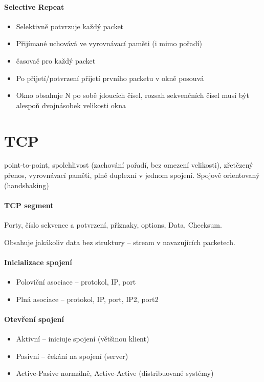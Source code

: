 \documentclass[a4paper, 11pt]{report}
\begin{document}
\paragraph{Selective Repeat}
\begin{itemize}
	\item Selektivně potvrzuje každý packet
	\item Přijímané uchovává ve vyrovnávací paměti (i mimo pořadí)
	\item časovač pro každý packet
	\item Po přijetí/potvrzení přijetí prvního packetu v okně posouvá
	\item Okno obsahuje N po sobě jdoucích čísel, rozsah sekvenčních čísel musí být alespoň dvojnásobek velikosti okna
\end{itemize}

\section{TCP}
point-to-point, spolehlivost (zachování pořadí, bez omezení velikosti), zřetězený přenos, vyrovnávací paměti, plně duplexní v jednom spojení. Spojově orientovaný (handshaking)

\paragraph{TCP segment}
Porty, číslo sekvence a potvrzení, příznaky, options, Data, Checksum.

Obsahuje jakákoliv data bez struktury -- stream v navazujících packetech.

\paragraph{Inicializace spojení}
\begin{itemize}
	\item Poloviční asociace -- protokol, IP, port
	\item Plná asociace -- protokol, IP, port, IP2, port2
\end{itemize}

\paragraph{Otevření spojení}
\begin{itemize}
	\item Aktivní -- iniciuje spojení (většinou klient)
	\item Pasivní -- čekání na spojení (server)
	\item Active-Pasive normálně, Active-Active (distribuované systémy)
\end{itemize}
\end{document}
